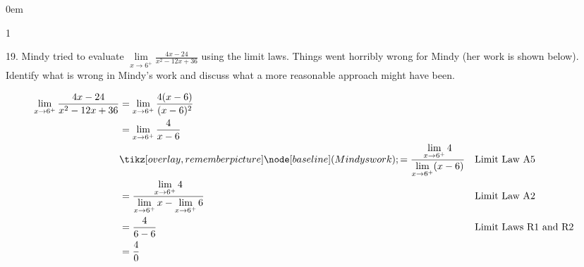 \documentclass[12pt,]{book}
\theoremstyle{plain}
\theoremstyle{definition}
\numberwithin{equation}{section}
\newenvironment{exercisegroup}%
{\medskip\noindent}%
{\par\bigskip}%
\newlength{\exercisegroupindent}%
\newlength{\exercisegroupitemwidth}%
\newenvironment{exercisegrouplist}%
{\vspace{-\partopsep}%
\begin{adjustwidth}{\exercisegroupindent}{0em}}%
{\end{adjustwidth}%
\vspace{-\partopsep}%
\vspace{\baselineskip}}%
\newenvironment{exercisegroupbycol}[1]%
{\begin{exercisegrouplist}%
\vspace{-\multicolsep}%
\begin{multicols}{#1}%
\setlength{\parindent}{0em}%
\setlength{\exercisegroupitemwidth}{\linewidth}}%
{\end{multicols}%
\vspace{-\multicolsep}%
\end{exercisegrouplist}}%
\providecommand\phantomsection{}
\newcommand{\tikzmark}[1]{\tikz[overlay,remember picture] \node[baseline] (#1) {};}%
\begin{document}
\begin{exerciselist}
\begin{exercisegroup}
\begin{exercisegroupbycol}{1}
\end{exercisegroupbycol}%
\end{exercisegroup}%
\item[19.]\phantomsection\hypertarget{exercise-92}{\null}Mindy tried to evaluate \(\lim\limits_{x\to6^{+}}\frac{4x-24}{x^2-12x+36}\) using the limit laws. Things went horribly wrong for Mindy (her work is shown below). Identify what is wrong in Mindy's work and discuss what a more reasonable approach might have been.%
\par
\begin{align*}
\lim_{x\to6^{+}}\frac{4x-24}{x^2-12x+36}&=\lim_{x\to6^{+}}\frac{4(x-6)}{(x-6)^2}\\
&=\lim_{x\to6^{+}}\frac{4}{x-6}\\
&\tikzmark{Mindys work}=\frac{\lim\limits_{x\to6^{+}}4}{\lim\limits_{x\to6^{+}}(x-6)}&&\text{Limit Law A5}\\
&=\frac{\lim\limits_{x\to6^{+}}4}{\lim\limits_{x\to6^{+}}x-\lim\limits_{x\to6^{+}}6}&&\text{Limit Law A2}\\
&=\frac{4}{6-6}&&\text{Limit Laws R1 and R2}\\
&=\frac{4}{0}
\end{align*}%
\par\smallskip
\end{exerciselist}
\typeout{************************************************}
\typeout{************************************************}
\end{document}
